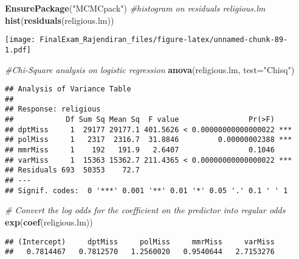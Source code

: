 \documentclass[]{article}
\newenvironment{Shaded}{\begin{snugshade}}{\end{snugshade}}
\newcommand{\CommentTok}[1]{\textcolor[rgb]{0.56,0.35,0.01}{\textit{#1}}}
\newcommand{\DataTypeTok}[1]{\textcolor[rgb]{0.13,0.29,0.53}{#1}}
\newcommand{\KeywordTok}[1]{\textcolor[rgb]{0.13,0.29,0.53}{\textbf{#1}}}
\newcommand{\NormalTok}[1]{#1}
\newcommand{\OperatorTok}[1]{\textcolor[rgb]{0.81,0.36,0.00}{\textbf{#1}}}
\newcommand{\StringTok}[1]{\textcolor[rgb]{0.31,0.60,0.02}{#1}}
\begin{document}
\begin{Shaded}
\begin{Highlighting}[]
\KeywordTok{EnsurePackage}\NormalTok{(}\StringTok{"MCMCpack"}\NormalTok{)}
\CommentTok{#histogram on residuals religious.lm}
\KeywordTok{hist}\NormalTok{(}\KeywordTok{residuals}\NormalTok{(religious.lm))}
\end{Highlighting}
\end{Shaded}

\texttt{[image: FinalExam\_Rajendiran\_files/figure-latex/unnamed-chunk-89-1.pdf]}

\begin{Shaded}
\begin{Highlighting}[]
\CommentTok{#Chi-Square analysis on logistic regression}
\KeywordTok{anova}\NormalTok{(religious.lm, }\DataTypeTok{test=}\StringTok{"Chisq"}\NormalTok{)}
\end{Highlighting}
\end{Shaded}

\begin{verbatim}
## Analysis of Variance Table
## 
## Response: religious
##            Df Sum Sq Mean Sq  F value                Pr(>F)    
## dptMiss     1  29177 29177.1 401.5626 < 0.00000000000000022 ***
## polMiss     1   2317  2316.7  31.8846         0.00000002388 ***
## mmrMiss     1    192   191.9   2.6407                0.1046    
## varMiss     1  15363 15362.7 211.4365 < 0.00000000000000022 ***
## Residuals 693  50353    72.7                                   
## ---
## Signif. codes:  0 '***' 0.001 '**' 0.01 '*' 0.05 '.' 0.1 ' ' 1
\end{verbatim}

\begin{Shaded}
\begin{Highlighting}[]
\CommentTok{# Convert the log odds for the coefficient on the predictor into regular odds}
\KeywordTok{exp}\NormalTok{(}\KeywordTok{coef}\NormalTok{(religious.lm))}
\end{Highlighting}
\end{Shaded}

\begin{verbatim}
## (Intercept)     dptMiss     polMiss     mmrMiss     varMiss 
##   0.7814467   0.7812570   1.2560020   0.9540644   2.7153276
\end{verbatim}

\begin{Shaded}
\end{Shaded}
\end{document}
